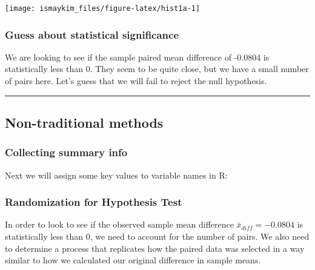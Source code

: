 \documentclass[]{tufte-book}
\newenvironment{Shaded}{\begin{snugshade}}{\end{snugshade}}
\newcommand{\StringTok}[1]{\textcolor[rgb]{0.31,0.60,0.02}{{#1}}}
\newcommand{\NormalTok}[1]{{#1}}
\let\oldrule=\rule
\renewcommand{\rule}[1]{\oldrule{\linewidth}}
\begin{document}
\begin{center}\texttt{[image: ismaykim\_files/figure-latex/hist1a-1]} \end{center}

\subsubsection{Guess about statistical
significance}\label{guess-about-statistical-significance-4}

We are looking to see if the sample paired mean difference of -0.0804 is
statistically less than 0. They seem to be quite close, but we have a
small number of pairs here. Let's guess that we will fail to reject the
null hypothesis.

\begin{center}\rule{0.5\linewidth}{\linethickness}\end{center}

\subsection{Non-traditional methods}\label{non-traditional-methods-4}

\subsubsection{Collecting summary info}\label{collecting-summary-info-2}

Next we will assign some key values to variable names in R:

\begin{Shaded}
\end{Shaded}

\subsubsection{Randomization for Hypothesis
Test}\label{randomization-for-hypothesis-test-2}

In order to look to see if the observed sample mean difference
\(\bar{x}_{diff} = -0.0804\) is statistically less than 0, we need to
account for the number of pairs. We also need to determine a process
that replicates how the paired data was selected in a way similar to how
we calculated our original difference in sample means.
\end{document}
